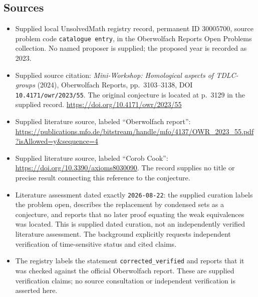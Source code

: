 \documentclass[11pt]{article}
\begin{document}
\subsection{Sources}
\begin{itemize}
\item Supplied local UnsolvedMath registry record, permanent ID \(30005700\), source problem code \texttt{catalogue entry}, in the Oberwolfach Reports Open Problems collection. No named proposer is supplied; the proposed year is recorded as 2023.
\item Supplied source citation: \emph{Mini-Workshop: Homological aspects of TDLC-groups} (2024), Oberwolfach Reports, pp.\ 3103--3138, DOI \texttt{10.4171/owr/2023/55}. The original conjecture is located at p.\ 3129 in the supplied record. \url{https://doi.org/10.4171/owr/2023/55}
\item Supplied literature source, labeled ``Oberwolfach report'': \url{https://publications.mfo.de/bitstream/handle/mfo/4137/OWR_2023_55.pdf?isAllowed=y&sequence=4}
\item Supplied literature source, labeled ``Corob Cook'': \url{https://doi.org/10.3390/axioms8030090}. The record supplies no title or precise result connecting this reference to the conjecture.
\item Literature assessment dated exactly \texttt{2026-08-22}: the supplied curation labels the problem open, describes the replacement by condensed sets as a conjecture, and reports that no later proof equating the weak equivalences was located. This is supplied dated curation, not an independently verified literature assessment. The background explicitly requests independent verification of time-sensitive status and cited claims.
\item The registry labels the statement \texttt{corrected\_verified} and reports that it was checked against the official Oberwolfach report. These are supplied verification claims; no source consultation or independent verification is asserted here.
\end{itemize}
\end{document}
